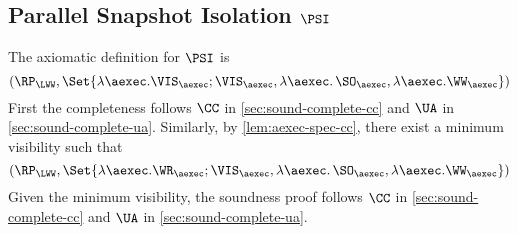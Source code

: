 \subsection{Parallel Snapshot Isolation \(\PSI\)}
\label{sec:sound-complete-psi}

The axiomatic definition for \( \PSI \) is 
\[ 
    (\RP_{\LWW}, \Set{\lambda \aexec. \VIS_{\aexec} ; \VIS_{\aexec}, \lambda \aexec \ldotp \SO_\aexec, \lambda \aexec. \WW_\aexec })
\]
First the completeness follows \( \CC \) in \cref{sec:sound-complete-cc} and \( \UA \) in \cref{sec:sound-complete-ua}.
Similarly, by \cref{lem:aexec-spec-cc},
there exist a minimum visibility such that 
\[ 
    (\RP_{\LWW}, \Set{\lambda \aexec. \WR_{\aexec} ; \VIS_{\aexec}, \lambda \aexec \ldotp \SO_\aexec, \lambda \aexec. \WW_\aexec })
\]
Given the minimum visibility, the soundness proof follows \( \CC \) in \cref{sec:sound-complete-cc} and \( \UA \) in \cref{sec:sound-complete-ua}.
